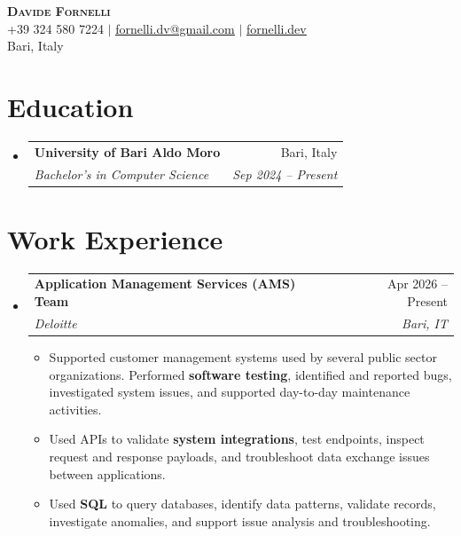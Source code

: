 \documentclass[letterpaper,11pt]{article}
\makeatletter
\newcommand{\resumeItem}[1]{\item\small{#1\vspace{-2pt}}}
\newcommand{\resumeSubheading}[4]{
  \vspace{-2pt}\item
  \begin{tabular*}{0.97\textwidth}[t]{l@{\extracolsep{\fill}}r}
    \textbf{#1} & #2 \\
    \textit{\small#3} & \textit{\small#4} \\
  \end{tabular*}\vspace{-7pt}
}
\newcommand{\resumeSubHeadingListStart}{\begin{itemize}[leftmargin=0.15in,label={}]}
\newcommand{\resumeSubHeadingListEnd}{\end{itemize}}
\newcommand{\resumeItemListStart}{\begin{itemize}}
\newcommand{\resumeItemListEnd}{\end{itemize}\vspace{-5pt}}
\makeatother
\begin{document}
\begin{center}
  \textbf{\Huge\scshape Davide Fornelli} \\ \vspace{1pt}
  \small +39 324 580 7224 $|$
  \href{mailto:fornelli.dv@gmail.com}{\underline{fornelli.dv@gmail.com}} $|$
  \href{https://fornelli.dev}{\underline{fornelli.dev}} \\ \vspace{2pt}
  \small Bari, Italy
\end{center}

\section{Education}
\resumeSubHeadingListStart
  \resumeSubheading
    {University of Bari Aldo Moro}{Bari, Italy}
    {Bachelor's in Computer Science}{Sep 2024 -- Present}
\resumeSubHeadingListEnd

\section{Work Experience}
\resumeSubHeadingListStart
  \resumeSubheading
    {Application Management Services (AMS) Team}{Apr 2026 -- Present}
    {Deloitte}{Bari, IT}
  \resumeItemListStart
    \resumeItem{Supported customer management systems used by several public sector organizations. Performed \textbf{software testing}, identified and reported bugs, investigated system issues, and supported day-to-day maintenance activities.}
    \resumeItem{Used APIs to validate \textbf{system integrations}, test endpoints, inspect request and response payloads, and troubleshoot data exchange issues between applications.}
    \resumeItem{Used \textbf{SQL} to query databases, identify data patterns, validate records, investigate anomalies, and support issue analysis and troubleshooting.}
  \resumeItemListEnd
\resumeSubHeadingListEnd
\end{document}
